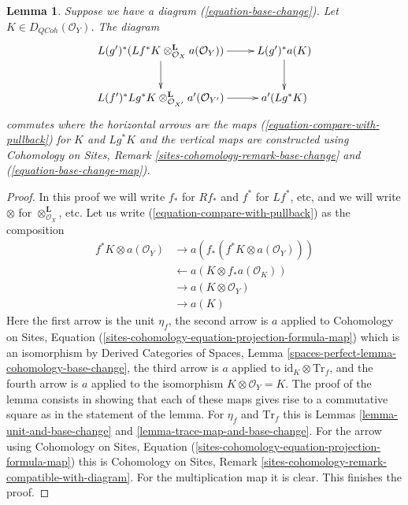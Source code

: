 \documentclass{stacks-project}
\theoremstyle{plain}
\newtheorem{lemma}[subsection]{Lemma}
\theoremstyle{definition}
\theoremstyle{remark}
\numberwithin{equation}{subsection}
\def\QCoh{\mathit{QCoh}}
\begin{document}
\begin{lemma}
\label{lemma-restriction-compare-with-pullback}
Suppose we have a diagram (\ref{equation-base-change}).
Let $K \in D_\QCoh(\mathcal{O}_Y)$. The diagram
$$
\xymatrix{
L(g')^*(Lf^*K \otimes^\mathbf{L}_{\mathcal{O}_X} a(\mathcal{O}_Y))
\ar[r] \ar[d] & L(g')^*a(K) \ar[d] \\
L(f')^*Lg^*K \otimes_{\mathcal{O}_{X'}}^\mathbf{L} a'(\mathcal{O}_{Y'})
\ar[r] & a'(Lg^*K)
}
$$
commutes where the horizontal arrows are the maps
(\ref{equation-compare-with-pullback}) for $K$ and $Lg^*K$
and the vertical maps are constructed using
Cohomology on Sites, Remark \ref{sites-cohomology-remark-base-change} and
(\ref{equation-base-change-map}).
\end{lemma}

\begin{proof}
In this proof we will write $f_*$ for $Rf_*$ and $f^*$ for $Lf^*$, etc,
and we will write $\otimes$ for $\otimes^\mathbf{L}_{\mathcal{O}_X}$, etc.
Let us write (\ref{equation-compare-with-pullback}) as the composition
\begin{align*}
f^*K \otimes a(\mathcal{O}_Y)
& \to
a(f_*(f^*K \otimes a(\mathcal{O}_Y))) \\
& \leftarrow
a(K \otimes f_*a(\mathcal{O}_K)) \\
& \to
a(K \otimes \mathcal{O}_Y) \\
& \to
a(K)
\end{align*}
Here the first arrow is the unit $\eta_f$, the second arrow is $a$
applied to Cohomology on Sites, Equation
(\ref{sites-cohomology-equation-projection-formula-map}) which is an
isomorphism by Derived Categories of Spaces, Lemma
\ref{spaces-perfect-lemma-cohomology-base-change}, the third arrow is
$a$ applied to $\text{id}_K \otimes \text{Tr}_f$, and the fourth
arrow is $a$ applied to the isomorphism $K \otimes \mathcal{O}_Y = K$.
The proof of the lemma consists in showing that each of these
maps gives rise to a commutative square as in the statement of the lemma.
For $\eta_f$ and $\text{Tr}_f$ this is
Lemmas \ref{lemma-unit-and-base-change} and
\ref{lemma-trace-map-and-base-change}.
For the arrow using Cohomology on Sites, Equation
(\ref{sites-cohomology-equation-projection-formula-map})
this is Cohomology on Sites, Remark
\ref{sites-cohomology-remark-compatible-with-diagram}.
For the multiplication map it is clear. This finishes the proof.
\end{proof}
\end{document}
